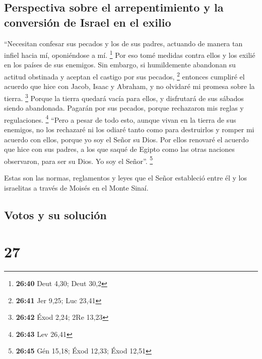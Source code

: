 \hypertarget{perspectiva-sobre-el-arrepentimiento-y-la-conversiuxf3n-de-israel-en-el-exilio}{%
\subsection{Perspectiva sobre el arrepentimiento y la conversión de
Israel en el
exilio}\label{perspectiva-sobre-el-arrepentimiento-y-la-conversiuxf3n-de-israel-en-el-exilio}}

 ``Necesitan confesar sus pecados y los de sus padres,
actuando de manera tan infiel hacia mí, oponiéndose a mí. \footnote{\textbf{26:40}
  Deut 4,30; Deut 30,2}  Por eso tomé medidas contra
ellos y los exilié en los países de sus enemigos. Sin embargo, si
humildemente abandonan su actitud obstinada y aceptan el castigo por sus
pecados, \footnote{\textbf{26:41} Jer 9,25; Luc 23,41} 
entonces cumpliré el acuerdo que hice con Jacob, Isaac y Abraham, y no
olvidaré mi promesa sobre la tierra. \footnote{\textbf{26:42} Éxod 2,24;
  2Re 13,23}  Porque la tierra quedará vacía para ellos,
y disfrutará de sus sábados siendo abandonada. Pagarán por sus pecados,
porque rechazaron mis reglas y regulaciones. \footnote{\textbf{26:43}
  Lev 26,41}  ``Pero a pesar de todo esto, aunque vivan
en la tierra de sus enemigos, no los rechazaré ni los odiaré tanto como
para destruirlos y romper mi acuerdo con ellos, porque yo soy el Señor
su Dios.  Por ellos renovaré el acuerdo que hice con sus
padres, a los que saqué de Egipto como las otras naciones observaron,
para ser su Dios. Yo soy el Señor''. \footnote{\textbf{26:45} Gén 15,18;
  Éxod 12,33; Éxod 12,51}

 Estas son las normas, reglamentos y leyes que el Señor
estableció entre él y los israelitas a través de Moisés en el Monte
Sinaí.

\hypertarget{votos-y-su-soluciuxf3n}{%
\subsection{Votos y su solución}\label{votos-y-su-soluciuxf3n}}

\hypertarget{section-26}{%
\section{27}\label{section-26}}


